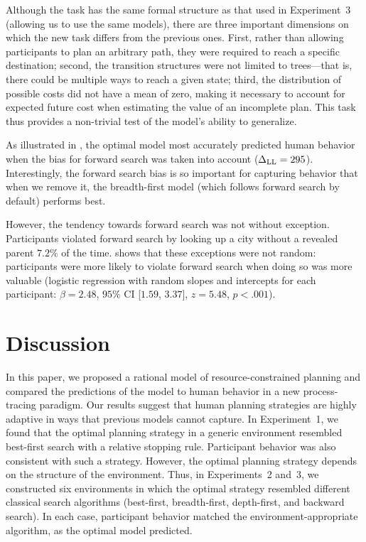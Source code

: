 Although the task has the same formal structure as that used in Experiment~3 (allowing us to use the same models), there are three important dimensions on which the new task differs from the previous ones. First, rather than allowing participants to plan an arbitrary path, they were required to reach a specific destination; second, the transition structures were not limited to trees---that is, there could be multiple ways to reach a given state; third, the distribution of possible costs did not have a mean of zero, making it necessary to account for expected future cost when estimating the value of an incomplete plan. This task thus provides a non-trivial test of the model's ability to generalize.

As illustrated in , the optimal model most accurately predicted human behavior when the bias for forward search was taken into account ($\Delta_{\mathrm{LL}} = 295$). Interestingly, the forward search bias is so important for capturing behavior that when we remove it, the breadth-first model (which follows forward search by default) performs best. 

However, the tendency towards forward search was not without exception. Participants violated forward search by looking up a city without a revealed parent $7.2\%$ of the time.  shows that these exceptions were not random: participants were more likely to violate forward search when doing so was more valuable (logistic regression with random slopes and intercepts for each participant: $\beta = 2.48$, $95\%$ CI [$1.59$, $3.37$], $z = 5.48$, $p < .001$).

\section{Discussion}\label{sec:planning-discussion}

In this paper, we proposed a rational model of resource-constrained planning and compared the predictions of the model to human behavior in a new process-tracing paradigm. Our results suggest that human planning strategies are highly adaptive in ways that previous models cannot capture. In Experiment~1, we found that the optimal planning strategy in a generic environment resembled best-first search with a relative stopping rule. Participant behavior was also consistent with such a strategy. However, the optimal planning strategy depends on the structure of the environment. Thus, in Experiments~2 and~3, we constructed six environments in which the optimal strategy resembled different classical search algorithms (best-first, breadth-first, depth-first, and backward search). In each case, participant behavior matched the environment-appropriate algorithm, as the optimal model predicted.

